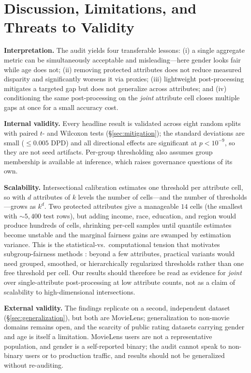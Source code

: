 \documentclass[conference]{IEEEtran}
\begin{document}
\section{Discussion, Limitations, and Threats to Validity}\label{sec:discussion}
\textbf{Interpretation.} The audit yields four transferable lessons: (i) a single
aggregate metric can be simultaneously acceptable and misleading---here gender looks
fair while age does not; (ii) removing protected attributes does not reduce measured disparity and
significantly worsens it via proxies; (iii) lightweight post-processing mitigates a targeted gap
but does not generalize across attributes; and (iv) conditioning the same post-processing
on the \emph{joint} attribute cell closes multiple gaps at once for a small accuracy cost.

\textbf{Internal validity.} Every headline result is validated across eight random splits
with paired $t$- and Wilcoxon tests (\S\ref{sec:mitigation}); the standard deviations are
small ($\leq0.005$ DPD) and all directional effects are significant at
$p<10^{-9}$, so they are not seed artifacts. Per-group thresholding also assumes group
membership is available at inference, which raises governance questions of its own.

\textbf{Scalability.} Intersectional calibration estimates one threshold per attribute
cell, so with $d$ attributes of $k$ levels the number of cells---and the number of
thresholds---grows as $k^{d}$. Two protected attributes give a manageable $14$ cells (the
smallest with ${\sim}5{,}400$ test rows), but adding income, race, education, and region
would produce hundreds of cells, shrinking per-cell samples until quantile estimates
become unstable and the marginal fairness gains are swamped by estimation variance. This
is the statistical-vs.\ computational tension that motivates subgroup-fairness methods
\cite{kearns2018gerrymandering}: beyond a few attributes, practical variants would need
grouped, smoothed, or hierarchically regularized thresholds rather than one free threshold
per cell. Our results should therefore be read as evidence for \emph{joint} over
single-attribute post-processing at low attribute counts, not as a claim of scalability to
high-dimensional intersections.

\textbf{External validity.} The findings replicate on a second, independent dataset
(\S\ref{sec:generalization}), but both are MovieLens; generalization to non-movie domains
remains open, and the scarcity of public rating datasets carrying gender and age is itself
a limitation. MovieLens users are not a representative population, and gender is a
self-reported binary; the audit cannot speak to non-binary users or to production traffic,
and results should not be generalized without re-auditing.
\end{document}
